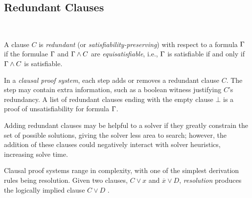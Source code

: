 \subsection{Redundant Clauses}~\label{subsec:redundant}

A clause $C$ is \emph{redundant} (or \emph{satisfiability-preserving}) with
respect to a formula $\Gamma$ if the formulae $\Gamma$ and $\Gamma \land
C$ are \emph{equisatisfiable}, i.e., $\Gamma$ is satisfiable if and only if
$\Gamma \land C$ is satisfiable.

In a \emph{clausal proof system}, each step adds or removes a redundant clause
$C$. The step may contain extra information, such as a boolean witness
justifying $C$'s redundancy. A list of redundant clauses ending with the empty
clause $\bot$ is a proof of unsatisfiability for formula $\Gamma$.


Adding redundant clauses may be helpful to a solver if they greatly
constrain the set of possible solutions, giving the solver
less area to search; however, the addition of these clauses
could negatively interact with solver heuristics, increasing solve time.


Clausal proof systems range in complexity, with one of the simplest derivation rules being resolution. 
Given two clauses, $C \lor x$ and $\overline{x} \lor D$,  \emph{resolution} produces the logically implied clause  $C
\lor D$ .

